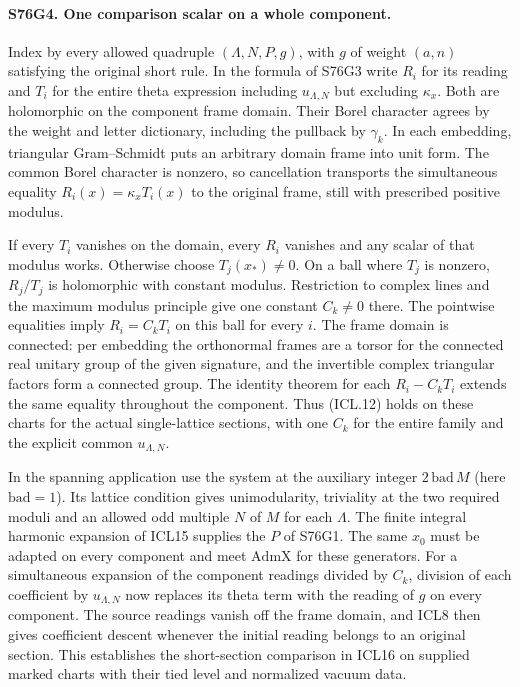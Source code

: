 \paragraph{S76G4. One comparison scalar on a whole component.}
Index by every allowed quadruple $(\Lambda,N,P,g)$, with $g$ of
weight $(a,n)$ satisfying the original short rule. In the formula
of S76G3 write $R_i$ for its reading and $T_i$ for the entire
theta expression including $u_{\Lambda,N}$ but excluding $\kappa_x$.
Both are holomorphic on the component frame domain. Their Borel
character agrees by the weight and letter dictionary, including
the pullback by $\gamma_k$. In each embedding, triangular
Gram--Schmidt puts an arbitrary domain frame into unit form.
The common Borel character is nonzero, so cancellation transports
the simultaneous equality $R_i(x)=\kappa_x T_i(x)$ to the original
frame, still with prescribed positive modulus.

If every $T_i$ vanishes on the domain, every $R_i$ vanishes and any
scalar of that modulus works. Otherwise choose $T_j(x_*)\ne0$.
On a ball where $T_j$ is nonzero, $R_j/T_j$ is holomorphic with
constant modulus. Restriction to complex lines and the maximum
modulus principle give one constant $C_k\ne0$ there. The pointwise
equalities imply $R_i=C_kT_i$ on this ball for every $i$. The frame
domain is connected: per embedding the orthonormal frames are a
torsor for the connected real unitary group of the given signature,
and the invertible complex triangular factors form a connected
group. The identity theorem for each $R_i-C_kT_i$ extends the same
equality throughout the component. Thus (ICL.12) holds on these
charts for the actual single-lattice sections, with one $C_k$
for the entire family and the explicit common $u_{\Lambda,N}$.

In the spanning application use the system at the auxiliary
integer $2\,\mathrm{bad}\,M$ (here $\mathrm{bad}=1$). Its
lattice condition gives unimodularity, triviality at the two
required moduli and an allowed odd multiple $N$ of $M$ for each
$\Lambda$. The finite integral harmonic expansion of ICL15 supplies
the $P$ of S76G1. The same $x_0$ must be adapted on every component
and meet $\mathrm{AdmX}$ for these generators. For a simultaneous
expansion of the component readings divided by $C_k$, division
of each coefficient by $u_{\Lambda,N}$ now replaces its theta
term with the reading of $g$ on every component. The source
readings vanish off the frame domain, and ICL8 then gives coefficient
descent whenever the initial reading belongs to an original section.
This establishes the short-section comparison in ICL16 on supplied
marked charts with their tied level and normalized vacuum data.
